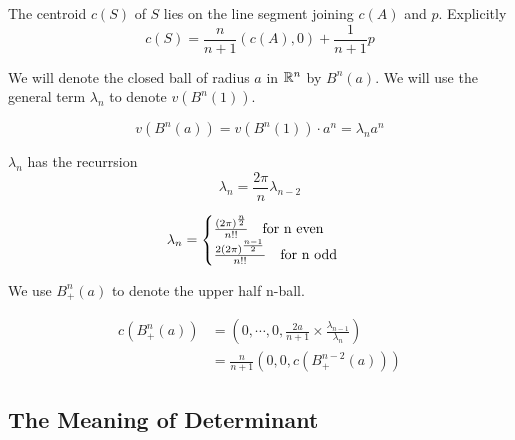 \begin{theorem}
    The centroid $c(S)$ of $S$ lies on the line segment joining $c(A)$ and $p$. Explicitly $$c(S)=\frac{n}{n+1}(c(A),0)+\frac{1}{n+1}p$$
\end{theorem}

\begin{definition}
    We will denote the closed ball of radius $a$ in $\mathbb{R}^n$ by $B^n(a)$.
    We will use the general term $\lambda_n$ to denote $v(B^n(1))$.
\end{definition}

\begin{theorem}
    $$v(B^n(a))=v(B^n(1))\cdot a^n=\lambda_na^n$$
\end{theorem}

\begin{theorem}
    $\lambda_n$ has the recurrsion $$\lambda_n=\frac{2\pi}{n}\lambda_{n-2}$$
\end{theorem}

\begin{theorem}
    \begin{equation}
        \lambda_n=
        \begin{cases}
            \frac{(2\pi)^{\frac{n}{2}}}{n!!}\text{\quad for n even}\\
            \frac{2(2\pi)^{\frac{n-1}{2}}}{n!!}\text{\quad for n odd}
        \end{cases}
    \end{equation}
\end{theorem}

\begin{definition}
    We use $B_+^n(a)$ to denote the upper half n-ball.
\end{definition}

\begin{theorem}
    \begin{equation}
        \begin{split}
            c(B_+^n(a)) &= (0,\cdots,0,\frac{2a}{n+1}\times\frac{\lambda_{n-1}}{\lambda_n})\\
            &=\frac{n}{n+1}(0,0,c(B_+^{n-2}(a)))
        \end{split}
    \end{equation}
\end{theorem}

\subsection{The Meaning of Determinant}

